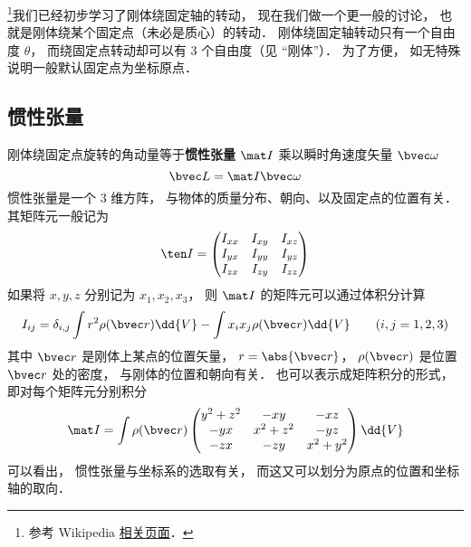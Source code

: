
\begin{issues}
\issueTODO
\end{issues}


\footnote{参考 Wikipedia \href{https://en.wikipedia.org/wiki/Moment_of_inertia}{相关页面}．}我们已经初步学习了刚体绕固定轴的转动， 现在我们做一个更一般的讨论， 也就是刚体绕某个固定点（未必是质心）的转动． 刚体绕固定轴转动只有一个自由度 $\theta$， 而绕固定点转动却可以有 3 个自由度（见 “刚体”）． 为了方便， 如无特殊说明一般默认固定点为坐标原点．

\subsection{惯性张量}
刚体绕固定点旋转的角动量等于\textbf{惯性张量} $\mat I$ 乘以瞬时角速度矢量 $\bvec \omega$
\begin{equation}\label{ITensr_eq3}
\bvec L = \mat I \bvec \omega
\end{equation}
惯性张量是一个 3 维方阵， 与物体的质量分布、朝向、以及固定点的位置有关． 其矩阵元一般记为
\begin{equation}
\ten I = \begin{pmatrix}
I_{xx}& I_{xy}& I_{xz} \\
I_{yx}& I_{yy}& I_{yz} \\
I_{zx}& I_{zy}& I_{zz}
\end{pmatrix}
\end{equation}
如果将 $x, y, z$ 分别记为 $x_1, x_2, x_3$， 则 $\mat I$ 的矩阵元可以通过体积分计算
\begin{equation}\label{ITensr_eq1}
I_{ij} = \delta_{i, j} \int r^2 \rho(\bvec r)\dd{V} - \int x_i x_j \rho(\bvec r)\dd{V} \qquad (i, j = 1, 2, 3)
\end{equation}
其中 $\bvec r$ 是刚体上某点的位置矢量， $r = \abs{\bvec r}$， $\rho(\bvec r)$ 是位置 $\bvec r$ 处的密度， 与刚体的位置和朝向有关． 也可以表示成矩阵积分的形式， 即对每个矩阵元分别积分
\begin{equation}\label{ITensr_eq2}
\mat I = \int \rho(\bvec r)
\begin{pmatrix}
y^2 + z^2 & -xy & -xz\\
-yx & x^2 + z^2 & -yz\\
-zx & -zy & x^2 + y^2
\end{pmatrix}
\dd{V}
\end{equation}
可以看出， 惯性张量与坐标系的选取有关， 而这又可以划分为原点的位置和坐标轴的取向．

